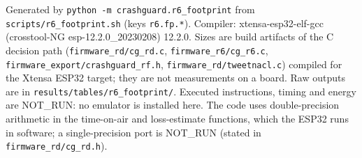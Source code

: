 


Generated by \texttt{python -m crashguard.r6\_footprint} from \texttt{scripts/r6\_footprint.sh} (keys \texttt{r6.fp.*}). Compiler: xtensa-esp32-elf-gcc (crosstool-NG esp-12.2.0\_20230208) 12.2.0. Sizes are build artifacts of the C decision path (\texttt{firmware\_rd/cg\_rd.c}, \texttt{firmware\_r6/cg\_r6.c}, \texttt{firmware\_export/crashguard\_rf.h}, \texttt{firmware\_rd/tweetnacl.c}) compiled for the Xtensa ESP32 target; they are not measurements on a board. Raw outputs are in \texttt{results/tables/r6\_footprint/}. Executed instructions, timing and energy are NOT\_RUN: no emulator is installed here. The code uses double-precision arithmetic in the time-on-air and loss-estimate functions, which the ESP32 runs in software; a single-precision port is NOT\_RUN (stated in \texttt{firmware\_rd/cg\_rd.h}).

